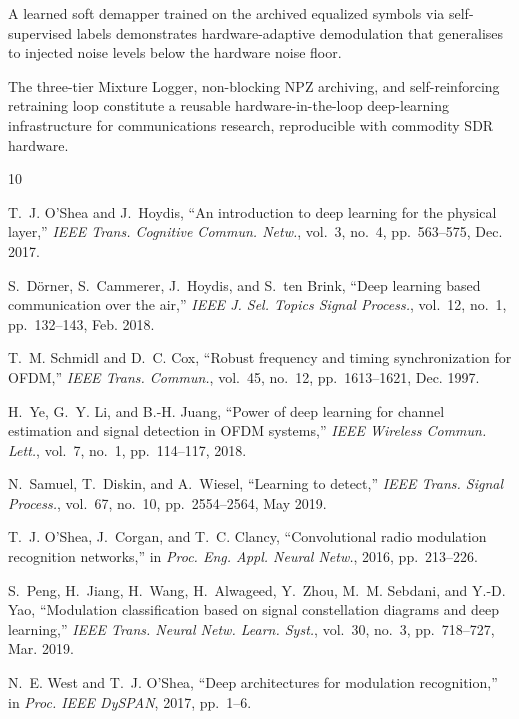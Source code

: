 \documentclass[conference]{IEEEtran}
\begin{document}
A learned soft demapper trained on the archived equalized symbols via
self-supervised labels demonstrates hardware-adaptive demodulation that
generalises to injected noise levels below the hardware noise floor.

The three-tier Mixture Logger, non-blocking NPZ archiving, and
self-reinforcing retraining loop constitute a reusable
hardware-in-the-loop deep-learning infrastructure for communications
research, reproducible with commodity SDR hardware.

\begin{thebibliography}{10}

T.~J. O'Shea and J.~Hoydis,
``An introduction to deep learning for the physical layer,''
\emph{IEEE Trans. Cognitive Commun. Netw.}, vol.~3, no.~4,
pp.~563--575, Dec. 2017.

S.~D\"{o}rner, S.~Cammerer, J.~Hoydis, and S.~ten Brink,
``Deep learning based communication over the air,''
\emph{IEEE J. Sel. Topics Signal Process.}, vol.~12, no.~1,
pp.~132--143, Feb. 2018.

T.~M. Schmidl and D.~C. Cox,
``Robust frequency and timing synchronization for OFDM,''
\emph{IEEE Trans. Commun.}, vol.~45, no.~12, pp.~1613--1621, Dec. 1997.

H.~Ye, G.~Y. Li, and B.-H. Juang,
``Power of deep learning for channel estimation and signal detection in
OFDM systems,''
\emph{IEEE Wireless Commun. Lett.}, vol.~7, no.~1, pp.~114--117, 2018.

N.~Samuel, T.~Diskin, and A.~Wiesel,
``Learning to detect,''
\emph{IEEE Trans. Signal Process.}, vol.~67, no.~10,
pp.~2554--2564, May 2019.

T.~J. O'Shea, J.~Corgan, and T.~C. Clancy,
``Convolutional radio modulation recognition networks,''
in \emph{Proc. Eng. Appl. Neural Netw.}, 2016, pp.~213--226.

S.~Peng, H.~Jiang, H.~Wang, H.~Alwageed, Y.~Zhou, M.~M. Sebdani,
and Y.-D. Yao,
``Modulation classification based on signal constellation diagrams and
deep learning,''
\emph{IEEE Trans. Neural Netw. Learn. Syst.}, vol.~30, no.~3,
pp.~718--727, Mar. 2019.

N.~E. West and T.~J. O'Shea,
``Deep architectures for modulation recognition,''
in \emph{Proc. IEEE DySPAN}, 2017, pp.~1--6.

\end{thebibliography}
\end{document}

